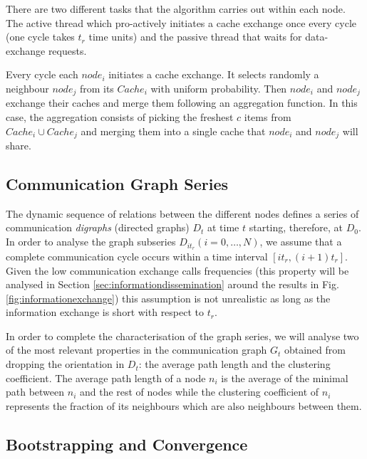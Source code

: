 There are two different tasks that the algorithm carries out within each
node. The active thread which pro-actively initiates a cache exchange once every cycle (one cycle takes $t_r$ time units) and the passive
thread that waits for data-exchange requests. 

Every cycle each $node_i$ initiates a cache exchange.
It selects randomly a neighbour $node_j$ from its $Cache_i$ with uniform probability.
Then $node_i$ and $node_j$ exchange their caches and merge them following an aggregation function.
In this case, the aggregation consists of picking the freshest $c$ items from $Cache_i \cup Cache_j$ 
and merging them into a single cache that $node_i$ and $node_j$ will share.

\subsection{Communication Graph Series}

The dynamic sequence of relations between the different nodes defines a
series of communication {\em digraphs} (directed graphs) $D_t$ at time
$t$ starting, therefore, at $D_0$. In order to analyse the graph
subseries $D_{it_r} (i=0,\dots,N)$, we assume that a complete
communication cycle occurs within a time interval
$[it_r,(i+1)t_r]$. Given  the low communication exchange calls
frequencies (this property will be analysed in Section
\ref{sec:informationdissemination} around the results in
Fig. \ref{fig:informationexchange}) this assumption is not unrealistic
as long as the information exchange is short with respect to $t_r$.

In order to complete the characterisation of the graph series, we will analyse two of the most relevant properties in the communication graph $G_t$ obtained from dropping the orientation in $D_t$: the average path length and the clustering coefficient. The average path length of a node $n_i$ is the average of the minimal path between $n_i$ and the rest of nodes while the clustering coefficient of $n_i$ represents the fraction of its neighbours which are also neighbours between them. 



\subsection{Bootstrapping and Convergence}
\label{sec:bootstrapping}

